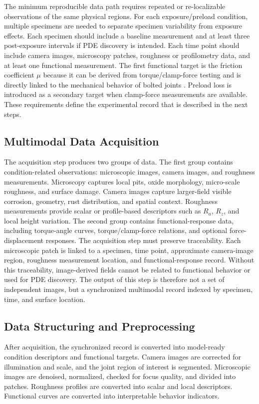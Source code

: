 \documentclass[colorlinks,upint,subscriptcorrection,varvw,hyphenate,balance]{asmeconf}
\begin{document}
The minimum reproducible data path requires repeated or re-localizable observations of the same physical regions. For each exposure/preload condition, multiple specimens are needed to separate specimen variability from exposure effects. Each specimen should include a baseline measurement and at least three post-exposure intervals if PDE discovery is intended. Each time point should include camera images, microscopy patches, roughness or profilometry data, and at least one functional measurement. The first functional target is the friction coefficient $\mu$ because it can be derived from torque/clamp-force testing and is directly linked to the mechanical behavior of bolted joints \cite{iso16047}.
Preload loss is introduced as a secondary target when clamp-force measurements are available.
These requirements define the experimental record that is described in the next steps.

\subsection{Multimodal Data Acquisition}
The acquisition step produces two groups of data. The first group contains condition-related observations: microscopic images, camera images, and roughness measurements. Microscopy captures local pits, oxide morphology, micro-scale roughness, and surface damage. Camera images capture larger-field visible corrosion, geometry, rust distribution, and spatial context. Roughness measurements provide scalar or profile-based descriptors such as $R_a$, $R_z$, and local height variation. The second group contains functional-response data, including torque-angle curves, torque/clamp-force relations, and optional force-displacement responses.
The acquisition step must preserve traceability. Each microscopic patch is linked to a specimen, time point, approximate camera-image region, roughness measurement location, and functional-response record. Without this traceability, image-derived fields cannot be related to functional behavior or used for PDE discovery. The output of this step is therefore not a set of independent images, but a synchronized multimodal record indexed by specimen, time, and surface location.

\subsection{Data Structuring and Preprocessing}
After acquisition, the synchronized record is converted into model-ready condition descriptors and functional targets. Camera images are corrected for illumination and scale, and the joint region of interest is segmented. Microscopic images are denoised, normalized, checked for focus quality, and divided into patches. Roughness profiles are converted into scalar and local descriptors. Functional curves are converted into interpretable behavior indicators.
\end{document}
